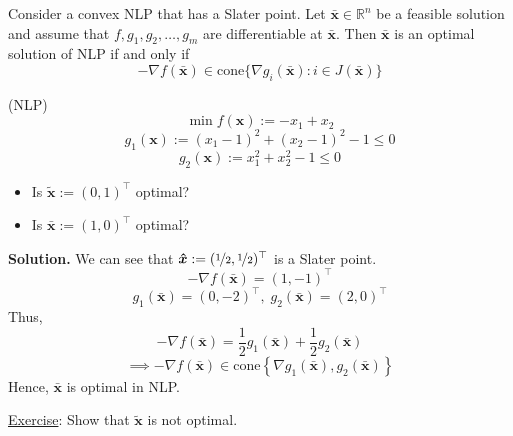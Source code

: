 \begin{thmbox}
    \begin{theorem}
        Consider a convex NLP that has a Slater point. Let $ \bm{\bar{x}}\in \mathbb{R}^{n} $
        be a feasible solution and assume that $ f,g_1,g_2,\ldots ,g_m $ are differentiable
        at $ \bm{\bar{x}} $. Then $ \bm{\bar{x}} $ is an optimal solution of NLP
        if and only if
        \[ -\nabla f(\bm{\bar{x}})\in\text{cone} \{\nabla g_i(\bm{\bar{x}}):i\in J(\bm{\bar{x}})\} \]
    \end{theorem}
\end{thmbox}

\begin{exbox}
    \begin{example}
        (NLP)
        \[ \min f(\bm{x}):=-x_1+x_2 \]
        \[ g_1(\bm{x}):=(x_1-1)^2+(x_2-1)^2-1\leqslant 0 \]
        \[ g_2(\bm{x}):=x_1^2+x_2^2-1\leqslant 0 \]
        \begin{itemize}
            \item Is $ \bm{\tilde{x}}:=(0,1)^\top $ optimal?
            \item Is $ \bm{\bar{x}}:=(1,0)^\top $ optimal?
        \end{itemize}
        \textbf{Solution.} We can see that $ \bm{\hat{x}}:=(\nicefrac{1}{2},\nicefrac{1}{2})^\top $
        is a Slater point.
        \[ -\nabla f(\bm{\bar{x}}) = (1,-1)^\top \]
        \[ g_1(\bm{\bar{x}})=(0,-2)^\top,\;g_2(\bm{\bar{x}})=(2,0)^\top \]
        Thus,
        \[ -\nabla f(\bm{\bar{x}})=\frac{1}{2} g_1(\bm{\bar{x}})+\frac{1}{2}g_2(\bm{\bar{x}})  \]
        \[ \implies  -\nabla f(\bm{\bar{x}})\in\text{cone} \left\{\nabla g_1(\bm{\bar{x}}),g_2(\bm{\bar{x}})\right\}  \]
        Hence, $ \bm{\bar{x}} $ is optimal in NLP.

        \underline{Exercise}: Show that $ \bm{\tilde{x}} $ is not optimal.
    \end{example}
\end{exbox}